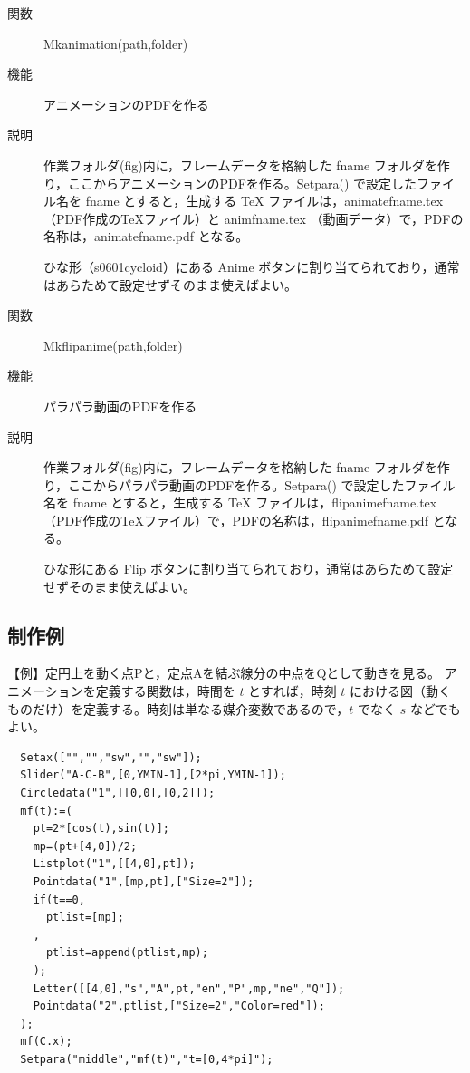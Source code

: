 \documentclass[papersize,a4paper,12pt,uplatex]{jsarticle}
\begin{document}
\begin{description}
\vspace{\baselineskip}
\item[関数]  Mkanimation(path,folder)
\item[機能]  アニメーションのPDFを作る
\item[説明]  作業フォルダ(fig)内に，フレームデータを格納した fname フォルダを作り，ここからアニメーションのPDFを作る。Setpara() で設定したファイル名を fname とすると，生成する TeX ファイルは，animatefname.tex （PDF作成のTeXファイル）と animfname.tex （動画データ）で，PDFの名称は，animatefname.pdf となる。

ひな形（s0601cycloid）にある Anime ボタンに割り当てられており，通常はあらためて設定せずそのまま使えばよい。

\vspace{\baselineskip}
\item[関数]  Mkflipanime(path,folder)
\item[機能]  パラパラ動画のPDFを作る
\item[説明]  作業フォルダ(fig)内に，フレームデータを格納した fname フォルダを作り，ここからパラパラ動画のPDFを作る。Setpara() で設定したファイル名を fname とすると，生成する TeX ファイルは，flipanimefname.tex （PDF作成のTeXファイル）で，PDFの名称は，flipanimefname.pdf となる。

ひな形にある Flip ボタンに割り当てられており，通常はあらためて設定せずそのまま使えばよい。


\end{description}

\subsection{制作例}

\vspace{\baselineskip}
【例】定円上を動く点Pと，定点Aを結ぶ線分の中点をQとして動きを見る。
アニメーションを定義する関数は，時間を $t$ とすれば，時刻 $t$ における図（動くものだけ）を定義する。時刻は単なる媒介変数であるので，$t$ でなく $s$ などでもよい。

\begin{verbatim}
  Setax(["","","sw","","sw"]);
  Slider("A-C-B",[0,YMIN-1],[2*pi,YMIN-1]);
  Circledata("1",[[0,0],[0,2]]);
  mf(t):=(
    pt=2*[cos(t),sin(t)];
    mp=(pt+[4,0])/2;
    Listplot("1",[[4,0],pt]);
    Pointdata("1",[mp,pt],["Size=2"]);
    if(t==0,
      ptlist=[mp];
    ,
      ptlist=append(ptlist,mp);
    );
    Letter([[4,0],"s","A",pt,"en","P",mp,"ne","Q"]);
    Pointdata("2",ptlist,["Size=2","Color=red"]);
  );
  mf(C.x);
  Setpara("middle","mf(t)","t=[0,4*pi]");
\end{verbatim}
\end{document}
